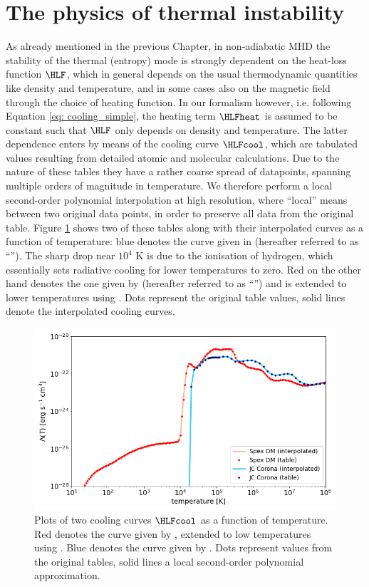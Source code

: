 \section{The physics of thermal instability}
As already mentioned in the previous Chapter, in non-adiabatic MHD the stability of the thermal (entropy) mode is strongly dependent on the heat-loss function $\HLF$, which in general depends on the usual thermodynamic quantities like density and temperature, and in some cases also on the magnetic field through the choice of heating function. In our formalism however, i.e. following Equation \eqref{eq: cooling_simple}, the heating term $\HLFheat$ is assumed to be constant such that $\HLF$ only depends on density and temperature. The latter dependence enters by means of the cooling curve $\HLFcool$, which are tabulated values resulting from detailed atomic and molecular calculations. Due to the nature of these tables they have a rather coarse spread of datapoints, spanning multiple orders of magnitude in temperature. We therefore perform a local second-order polynomial interpolation at high resolution, where ``local'' means between two original data points, in order to preserve all data from the original table.
Figure \ref{fig: coolingcurves} shows two of these tables along with their interpolated curves as a function of temperature: blue denotes the curve given in \citet{colgan2008} (hereafter referred to as ``\jccorona''). The sharp drop near $10^4$ K is due to the ionisation of hydrogen, which essentially sets radiative cooling for lower temperatures to zero. Red on the other hand denotes the one given by \citet{schure2009} (hereafter referred to as ``\spexdm'') and is extended to lower temperatures using \citet{dalgarno1972}. Dots represent the original table values, solid lines denote the interpolated cooling curves.

\begin{figure}[t]
  \centering
  \includegraphics[width=\textwidth]{coolingcurves.png}
  \caption{
    Plots of two cooling curves $\HLFcool$ as a function of temperature. Red denotes the curve given by \citet{schure2009}, extended to low temperatures using \citet{dalgarno1972}. Blue denotes the curve given by \citet{colgan2008}. Dots represent values from the original tables, solid lines a local second-order polynomial approximation.
  }
  \label{fig: coolingcurves}
\end{figure}

